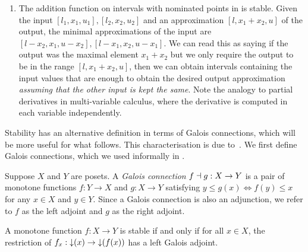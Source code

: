 \begin{example}
\begin{enumerate}[leftmargin=\enummargin]
  \item The addition function on intervals with nominated points in
     is stable. Given the input
    $[l_1,x_1,u_1], [l_2,x_2,u_2]$ and an approximation
    $[l,x_1+x_2,u]$ of the output, the minimal approximations of the
    input are $[l-x_2,x_1,u-x_2], [l-x_1,x_2,u-x_1]$. We can read this
    as saying if the output was the maximal element $x_1+x_2$ but we
    only require the output to be in the range $[l,x_1+x_2,u]$, then
    we can obtain intervals containing the input values that are
    enough to obtain the desired output approximation \emph{assuming
      that the other input is kept the same}. Note the analogy to
    partial derivatives in multi-variable calculus, where the
    derivative is computed in each variable independently.
  \end{enumerate}
\end{example}


Stability has an alternative definition in terms of Galois
connections, which will be more useful for what follows. This
characterisation is due to~\citet{taylor99}. We first define Galois
connections, which we used informally in .

\begin{definition}
  \label{def:galois-connection}
  Suppose $X$ and $Y$ are posets. A \emph{Galois connection} $f \dashv g: X \to Y$ is a pair of monotone functions $f: Y \to X$ and $g: X \to Y$ satisfying $y \leq g(x) \iff f(y) \leq x$ for any $x \in X$ and $y \in Y$. Since a Galois connection is also an adjunction, we refer to $f$ as the left adjoint and $g$ as the right adjoint.
\end{definition}

\begin{lemma}
  A monotone function $f : X \to Y$ is stable if and only if for all
  $x \in X$, the restriction of $f_x : \mathop{\downarrow}(x) \to \mathop{\downarrow}(f(x))$
  has a left Galois adjoint.
\end{lemma}

